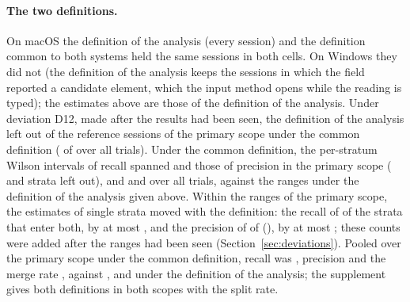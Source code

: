 \paragraph{The two definitions.} On macOS the definition of the analysis (every session) and the definition common to
both systems held the same sessions in both cells. On Windows they did not (the
definition of the analysis keeps the sessions in which the field reported a candidate element, which the input method
opens while the reading is typed); the estimates above are those of the definition of the analysis. Under deviation
D12, made after the results had been seen, the definition of the analysis left out
 of the
 reference sessions of the primary scope under the common definition
( of  over all trials). Under
the common definition, the per-stratum Wilson intervals of recall spanned
 and those of precision
 in the primary scope
( and
 strata left out), and
 and  over
all trials, against the ranges under the definition of the analysis given above. Within the ranges of the primary
scope, the estimates of single strata moved with the definition: the recall of
 of the 
strata that enter both, by at most , and the precision of
 of 
(), by at most
; these counts were added after the ranges had been seen
(Section~\ref{sec:deviations}). Pooled over the primary scope under
the common definition, recall was , precision
 and the merge rate
, against ,
 and 
under the definition of the analysis; the supplement gives both definitions in both scopes with the split rate.

